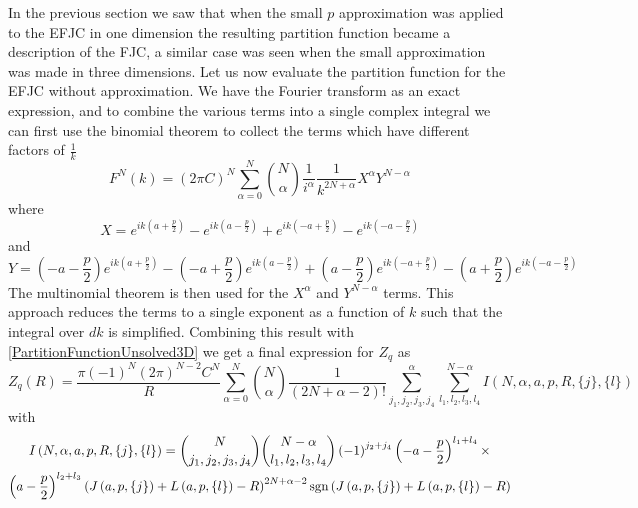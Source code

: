In the previous section we saw that when the small $p$ approximation was applied to the EFJC in one dimension the resulting partition function became a description of the FJC, a similar case was seen when the small approximation was made in three dimensions. Let us now evaluate the partition function for the EFJC without approximation. We have the Fourier transform as an exact expression, and to combine the various terms into a single complex integral we can first use the binomial theorem to collect the terms which have different factors of $\frac{1}{k}$
%
\begin{equation}
F^{N}(k)=\left(2\pi C\right)^{N}\sum_{\alpha=0}^{N}\binom{N}{\alpha}\frac{1}{i^{\alpha}}\frac{1}{k^{2N+\alpha}}X^{\alpha}Y^{N-\alpha}
\end{equation}
%
where
%
\begin{equation}
X=e^{ik\left(a+\frac{p}{2}\right)}-e^{ik\left(a-\frac{p}{2}\right)}+e^{ik\left(-a+\frac{p}{2}\right)}-e^{ik\left(-a-\frac{p}{2}\right)}
\end{equation}
%
and
%
\begin{equation}
Y=\left(-a-\frac{p}{2}\right)e^{ik\left(a+\frac{p}{2}\right)}-\left(-a+\frac{p}{2}\right)e^{ik\left(a-\frac{p}{2}\right)}+\left(a-\frac{p}{2}\right)e^{ik\left(-a+\frac{p}{2}\right)}-\left(a+\frac{p}{2}\right)e^{ik\left(-a-\frac{p}{2}\right)}
\end{equation}
%
The multinomial theorem is then used for the $X^{\alpha}$ and $Y^{N-\alpha}$ terms. This approach reduces the terms to a single exponent as a function of $k$ such that the integral over $dk$ is simplified. Combining this result with \eqref{PartitionFunctionUnsolved3D} we get a final expression for $Z_{q}$ as
%
\begin{equation}
Z_{q}(R)=\frac{\pi \left(-1\right)^{N}\left(2\pi\right)^{N-2}C^{N}}{R}\sum_{\alpha=0}^{N}\binom{N}{\alpha}\frac{1}{\left(2N+\alpha-2\right)!}\sum_{j_{1},j_{2},j_{3},j_{4}}^{\alpha}\sum_{l_{1},l_{2},l_{3},l_{4}}^{N-\alpha}I\left(N,\alpha,a,p,R,\{j\},\{l\}\right)
\label{PartitionFunctionFiniteP}
\end{equation}
%
with
%
\begin{multline}
I\left(N,\alpha,a,p,R,\{j\},\{l\}\right)=\binom{N}{j_{1},j_{2},j_{3},j_{4}}\binom{N-\alpha}{l_{1},l_{2},l_{3},l_{4}}\left(-1\right)^{j_{2}+j_{4}}\left(-a-\frac{p}{2}\right)^{l_{1}+l_{4}} \times \\ \left(a-\frac{p}{2}\right)^{l_{2}+l_{3}}\left(J\left(a,p,\{j\}\right)+L\left(a,p,\{l\}\right)-R\right)^{2N+\alpha-2}\text{sgn}\left(J\left(a,p,\{j\}\right)+L\left(a,p,\{l\}\right)-R\right)
\end{multline}
